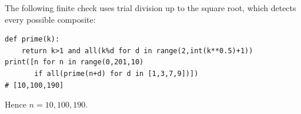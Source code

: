 The following finite check uses trial division up to the square root, which detects every possible composite:\begin{verbatim}
def prime(k):
    return k>1 and all(k%d for d in range(2,int(k**0.5)+1))
print([n for n in range(0,201,10)
       if all(prime(n+d) for d in [1,3,7,9])])
# [10,100,190]
\end{verbatim}
Hence $\boxed{n=10,100,190}$.
